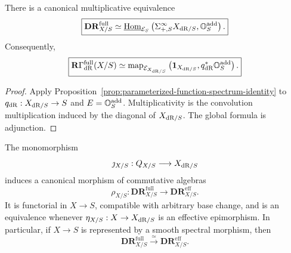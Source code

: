 \begin{proposition}
\label{prop:full-dr-internal-functions}
There is a canonical multiplicative equivalence
\[
\boxed{
    \mathbf{DR}^{\mathrm{full}}_{X/S}
    \simeq
    \underline{\operatorname{Hom}}_{\mathcal E_S}
    \left(
        \Sigma^\infty_{+,S}X_{\mathrm{dR}/S},
        \mathbb O_S^{\mathrm{add}}
    \right).
}
\]
Consequently,
\[
\boxed{
    \mathbf R\Gamma_{\mathrm{dR}}^{\mathrm{full}}(X/S)
    \simeq
    \operatorname{map}_{\mathcal E_{X_{\mathrm{dR}/S}}}
    \left(
        \mathbf1_{X_{\mathrm{dR}/S}},
        q_{\mathrm{dR}}^*\mathbb O_S^{\mathrm{add}}
    \right).
}
\]
\end{proposition}

\begin{proof}
Apply Proposition~\ref{prop:parameterized-function-spectrum-identity} to
\(q_{\mathrm{dR}}:X_{\mathrm{dR}/S}\to S\) and \(E=\mathbb O_S^{\mathrm{add}}\).  Multiplicativity is the convolution
multiplication induced by the diagonal of \(X_{\mathrm{dR}/S}\).  The global formula is adjunction.
\end{proof}

\begin{theorem}
\label{thm:full-effective-dr-comparison}
The monomorphism
\[
    \jmath_{X/S}:Q_{X/S}\longrightarrow X_{\mathrm{dR}/S}
\]
induces a canonical morphism of commutative algebras
\[
\boxed{
    \rho_{X/S}:
    \mathbf{DR}^{\mathrm{full}}_{X/S}
    \longrightarrow
    \mathbf{DR}^{\mathrm{eff}}_{X/S}.
}
\]
It is functorial in \(X\to S\), compatible with arbitrary base change, and is an equivalence whenever
\(\eta_{X/S}:X\to X_{\mathrm{dR}/S}\) is an effective epimorphism.  In particular, if \(X\to S\) is
represented by a smooth spectral morphism, then
\[
\boxed{
    \mathbf{DR}^{\mathrm{full}}_{X/S}
    \xrightarrow{\simeq}
    \mathbf{DR}^{\mathrm{eff}}_{X/S}.
}
\]
\end{theorem}

